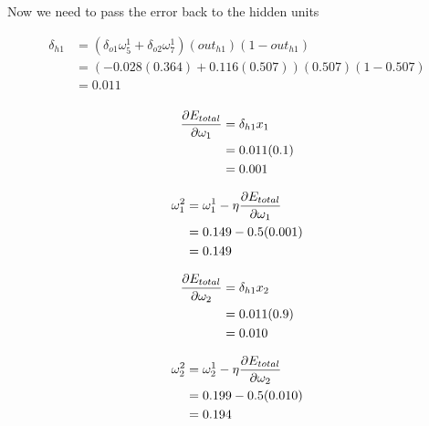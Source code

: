 \documentclass[10pt,a4paper]{article}
\begin{document}
Now we need to pass the error back to the hidden units

\begin{equation}
\begin{split}
\delta_{h1} &= (\delta_{o1}\omega_5^1 + \delta_{o2}\omega_7^1)(out_{h1})(1-out_{h1})\\
&= (-0.028(0.364) +0.116(0.507))(0.507)(1-0.507)\\
&= 0.011\\
\end{split}
\end{equation}

\begin{equation}
\begin{split}
\pdv{E_{total}}{\omega_1} &= \delta_{h1}x_1\\ 
                          &= 0.011(0.1)\\
                          &= 0.001\\
\end{split}
\end{equation}

\begin{equation}
\begin{split}
\omega_1^2 &= \omega_1^1 - \eta\pdv{E_{total}}{\omega_1}\\
           &= 0.149 -0.5(0.001)\\
           &= 0.149\\
\end{split}
\end{equation}

\begin{equation}
\begin{split}
\pdv{E_{total}}{\omega_2} &= \delta_{h1}x_2\\ 
                          &= 0.011(0.9)\\
                          &= 0.010\\
\end{split}
\end{equation}

\begin{equation}
\begin{split}
\omega_2^2 &= \omega_2^1 - \eta\pdv{E_{total}}{\omega_2}\\
           &= 0.199 -0.5(0.010)\\
           &= 0.194\\
\end{split}
\end{equation}
\end{document}
